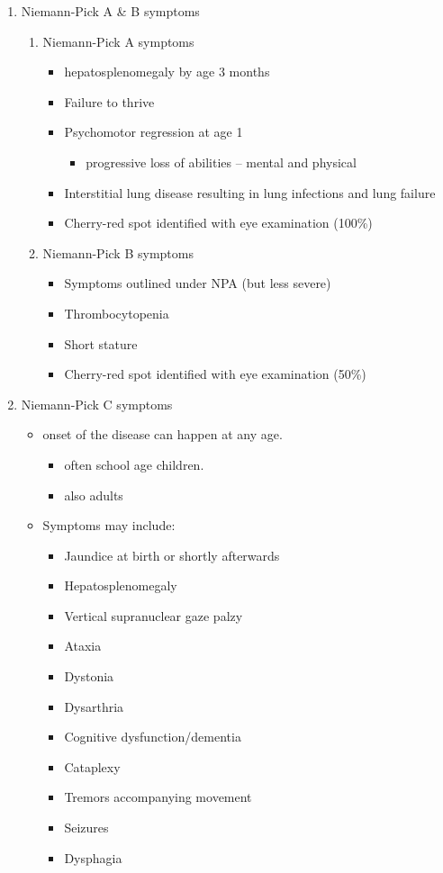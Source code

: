 \documentclass{scrartcl}
\begin{document}
\begin{enumerate}
\item Niemann-Pick A \& B symptoms
\label{sec:org89db66c}

\begin{enumerate}
\item Niemann-Pick A symptoms
\label{sec:org5de822c}
\begin{itemize}
\item hepatosplenomegaly by age 3 months
\item Failure to thrive
\item Psychomotor regression at age 1
\begin{itemize}
\item progressive loss of abilities – mental and physical
\end{itemize}
\item Interstitial lung disease resulting in lung infections and lung failure
\item Cherry-red spot identified with eye examination (100\%)
\end{itemize}

\item Niemann-Pick B symptoms
\label{sec:org0be0848}
\begin{itemize}
\item Symptoms outlined under NPA (but less severe)
\item Thrombocytopenia
\item Short stature
\item Cherry-red spot identified with eye examination (50\%)
\end{itemize}
\end{enumerate}

\item Niemann-Pick C symptoms
\label{sec:org7c81d0b}

\begin{itemize}
\item onset of the disease can happen at any age.
\begin{itemize}
\item often school age children.
\item also adults
\end{itemize}

\item Symptoms may include:
\begin{itemize}
\item Jaundice at birth or shortly afterwards
\item Hepatosplenomegaly
\item Vertical supranuclear gaze palzy
\item Ataxia
\item Dystonia
\item Dysarthria
\item Cognitive dysfunction/dementia
\item Cataplexy
\item Tremors accompanying movement
\item Seizures
\item Dysphagia
\end{itemize}
\end{itemize}


\end{enumerate}
\end{document}
